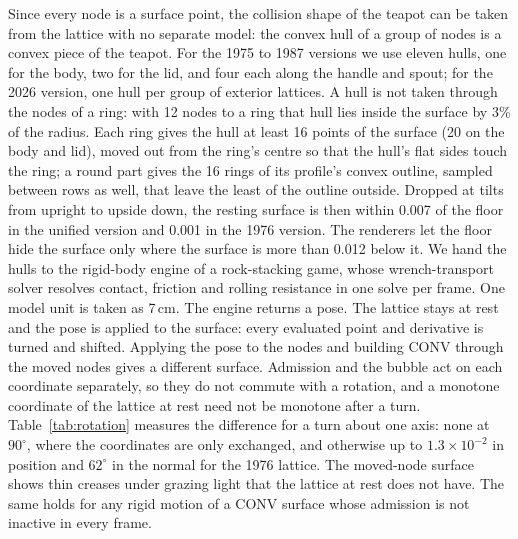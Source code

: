 \documentclass[journal]{IEEEtran}
\begin{document}
Since every node is a surface point, the collision shape of the teapot
can be taken from the lattice with no separate model: the convex hull of
a group of nodes is a convex piece of the teapot. For the 1975 to 1987
versions we use eleven hulls, one for the body, two for the lid, and four
each along the handle and spout; for the 2026 version, one hull per
group of exterior lattices. A hull is not taken through the nodes of a ring: with 12 nodes to a
ring that hull lies inside the surface by 3\% of the radius. Each ring gives
the hull at least 16 points of the surface (20 on the body and lid),
moved out from the ring's centre so that the hull's flat sides touch the
ring; a round part gives the 16 rings of its profile's convex outline,
sampled between rows as well, that leave the least of the outline
outside. Dropped at tilts from upright to upside down, the resting
surface is then within 0.007 of the floor in the unified version and
0.001 in the 1976 version.
The renderers let the floor hide the surface only where the surface is
more than 0.012 below it. We hand the hulls to the rigid-body engine of a rock-stacking game,
whose wrench-transport solver resolves contact, friction and rolling
resistance in one solve per frame. One model unit is taken as 7\,cm. The
engine returns a pose. The lattice stays at rest and the pose is applied
to the surface: every evaluated point and derivative is turned and
shifted. Applying the pose to the nodes and building CONV
through the moved nodes gives a different surface. Admission and the
bubble act on each coordinate separately, so they do not commute with a
rotation, and a monotone coordinate of the lattice at rest need not be
monotone after a turn. Table~\ref{tab:rotation} measures the difference
for a turn about one axis: none at $90^\circ$, where the coordinates are
only exchanged, and otherwise up to $1.3\times10^{-2}$ in position and
$62^\circ$ in the normal for the 1976 lattice. The moved-node surface
shows thin creases under grazing light that the lattice at rest does not
have. The same holds for any rigid motion of a CONV surface whose
admission is not inactive in every frame.
\end{document}
